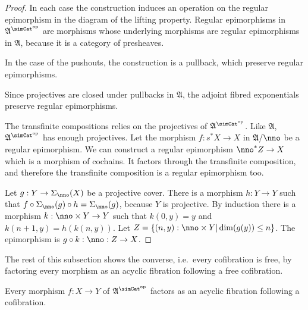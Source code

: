 \documentclass{tac}
\newcommand\hide[1]{}
\newcommand\set[1]{\left\{#1\right\}}
\newcommand\ri{^*}
\newcommand\dual{^{\mathrm{op}}}
\newcommand\s{^{\simCat\dual}}
\newcommand\of{:}
\newcommand\ambient{\mathfrak A}
\begin{document}
\begin{proof}
In each case the construction induces an operation on the regular epimorphism in the diagram of the lifting property. 
Regular epimorphisms in $\ambient\s$ are morphisms whose underlying morphisms are regular epimorphisms in $\ambient$, because it is a category of presheaves.%
\hide{
Maybe a simple argument is that exact completion and simplicial set forming commute?
}

In the case of the pushouts, the construction is a pullback, which preserve regular epimorphisms.

Since projectives are closed under pullbacks in $\ambient$, the adjoint fibred exponentials preserve regular epimorphisms.

\hide{
The lemma may be worth generalizing for 2-out-of-3.

Examples of factorization systems: projective versus regular epic, decidable versus split epic
}

The transfinite compositions relies on the projectives of $\ambient\s$. Like $\ambient$, $\ambient\s$ has enough projectives. Let the morphism $f\of s\ri X\to X$ in $\ambient/\nno$ be a regular epimorphism. We can construct a regular epimorphism $\nno\ri Z\to X$ which is a morphism of cochains. It factors through the transfinite composition, and therefore the transfinite composition is a regular epimorphism too.

Let $g\of Y\to \Sigma_\nno(X)$ be a projective cover. There is a morphism $h\of Y\to Y$ such that $f\circ \Sigma_\nno(g)\circ h=\Sigma_\nno(g)$, because $Y$ is projective. By induction there is a morphism $k\of\nno\times Y\to Y$ such that $k(0,y)=y$ and $k(n+1,y)=h(k(n,y))$. Let $Z=\set{(n,y)\of\nno\times Y| \dim(g(y))\leq n}$. The epimorphism is $g\circ k\of \nno\of Z\to X$. \hide{check this!}
\end{proof}

The rest of this subsection shows the converse, i.e.\ every cofibration is free, by factoring every morphism as an acyclic fibration following a free cofibration.

\begin{proposition} Every morphism $f\of X\to Y$ of $\ambient\s$ factors as an acyclic fibration following a cofibration. \label{factor1} \end{proposition}
\end{document}
